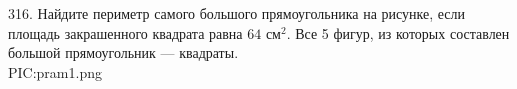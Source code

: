 316. Найдите периметр самого большого прямоугольника на рисунке, если площадь закрашенного квадрата равна $64\text{ см}^2.$ Все 5 фигур, из которых составлен большой прямоугольник --- квадраты.\\
{{PIC:pram1.png}}\\

